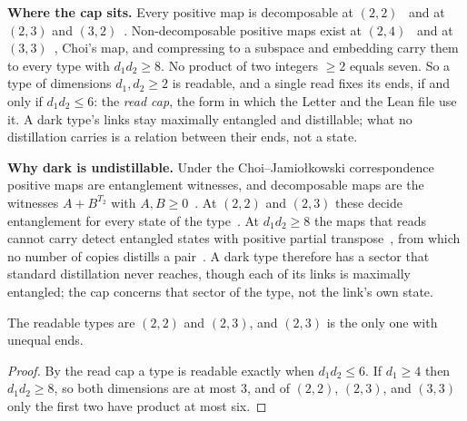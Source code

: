 \textbf{Where the cap sits.} Every positive map is decomposable at $(2,2)$~\cite{stormer1963} and at $(2,3)$ and $(3,2)$~\cite{woronowicz}. Non-decomposable positive maps exist at $(2,4)$~\cite{woronowicz} and at $(3,3)$~\cite{choi1975}, Choi's map, and compressing to a subspace and embedding carry them to every type with $d_{1}d_{2}\geq 8$. No product of two integers $\geq 2$ equals seven. So a type of dimensions $d_{1},d_{2}\geq 2$ is readable, and a single read fixes its ends, if and only if $d_{1}d_{2}\leq 6$: the \emph{read cap}, the form in which the Letter and the Lean file use it. A dark type's links stay maximally entangled and distillable; what no distillation carries is a relation between their ends, not a state.

\textbf{Why dark is undistillable.} Under the Choi--Jamio{\l}kowski correspondence~\cite{choi1975cp,jamiolkowski1972} positive maps are entanglement witnesses, and decomposable maps are the witnesses $A+B^{T_{2}}$ with $A,B\geq 0$~\cite{horodecki1996,horodecki2009}. At $(2,2)$ and $(2,3)$ these decide entanglement for every state of the type~\cite{horodecki1996}. At $d_{1}d_{2}\geq 8$ the maps that reads cannot carry detect entangled states with positive partial transpose~\cite{phorodecki1997}, from which no number of copies distills a pair~\cite{horodecki1998}. A dark type therefore has a sector that standard distillation never reaches, though each of its links is maximally entangled; the cap concerns that sector of the type, not the link's own state.

\begin{lemma}
\label{lem:s-readrule}
The readable types are $(2,2)$ and $(2,3)$, and $(2,3)$ is the only one with unequal ends.
\end{lemma}
\begin{proof}
By the read cap a type is readable exactly when $d_{1}d_{2}\leq 6$. If $d_{1}\geq 4$ then $d_{1}d_{2}\geq 8$, so both dimensions are at most $3$, and of $(2,2)$, $(2,3)$, and $(3,3)$ only the first two have product at most six.
\end{proof}


